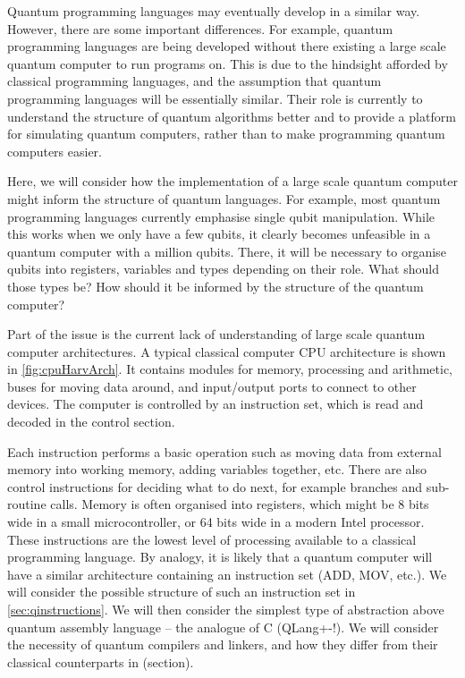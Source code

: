 Quantum programming languages may eventually develop in a similar way. However, there are some important differences. For example, quantum programming languages are being developed without there existing a large scale quantum computer to run programs on. This is due to the hindsight afforded by classical programming languages, and the assumption that quantum programming languages will be essentially similar. Their role is currently to understand the structure of quantum algorithms better and to provide a platform for simulating quantum computers, rather than to make programming quantum computers easier. 

Here, we will consider how the implementation of a large scale quantum computer might inform the structure of quantum languages. For example, most quantum programming languages currently emphasise single qubit manipulation. While this works when we only have a few qubits, it clearly becomes unfeasible in a quantum computer with a million qubits. There, it will be necessary to organise qubits into registers, variables and types depending on their role. What should those types be? How should it be informed by the structure of the quantum computer?

Part of the issue is the current lack of understanding of large scale quantum computer architectures. A typical classical computer CPU architecture is shown in \autoref{fig:cpuHarvArch}. It contains modules for memory, processing and arithmetic, buses for moving data around, and input/output ports to connect to other devices. The computer is controlled by an instruction set, which is read and decoded in the control section. 

Each instruction performs a basic operation such as moving data from external memory into working memory, adding variables together, etc. There are also control instructions for deciding what to do next, for example branches and sub-routine calls. Memory is often organised into registers, which might be 8 bits wide in a small microcontroller, or 64 bits wide in a modern Intel processor. These instructions are the lowest level of processing available to a classical programming language. 
% 
By analogy, it is likely that a quantum computer will have a similar architecture containing an instruction set (ADD, MOV, etc.). We will consider the possible structure of such an instruction set in \autoref{sec:qinstructions}. We will then consider the simplest type of abstraction above quantum assembly language -- the analogue of C (QLang+-!). We will consider the necessity of quantum compilers and linkers, and how they differ from their classical counterparts in (section). 

